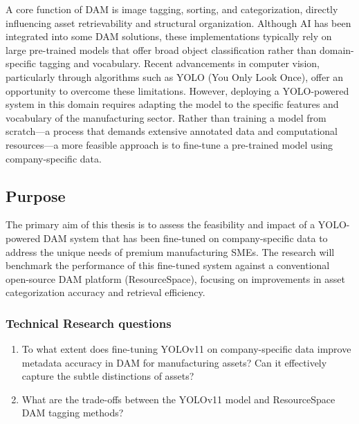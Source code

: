 \documentclass[a4paper,10pt,twocolumn]{article}
\numberwithin{figure}{section}
\numberwithin{table}{section}
\begin{document}
A core function of DAM is image tagging, sorting, and categorization, directly influencing asset 
retrievability and structural organization. Although AI has been integrated into some DAM solutions,
 these implementations typically rely on large pre-trained models that offer broad object classification 
 rather than domain-specific tagging and vocabulary. Recent advancements in computer vision, 
 particularly through algorithms such as YOLO (You Only Look Once), 
offer an opportunity to overcome these limitations. However, deploying a YOLO-powered system in this domain
 requires adapting the model to the specific features and vocabulary of the manufacturing sector. Rather than
  training a model from scratch—a process that demands extensive annotated data and computational resources—a 
  more feasible approach is to fine-tune a pre-trained model using company-specific data. 


\subsection{Purpose}
The primary aim of this thesis is to assess the feasibility and impact of a YOLO-powered DAM system 
that has been fine-tuned on company-specific data to address the unique needs of premium manufacturing SMEs. 
The research will benchmark the performance of this fine-tuned system against a conventional open-source DAM 
platform (ResourceSpace), focusing on improvements in asset categorization accuracy
and retrieval efficiency. 

\vspace{0.3cm}
\subsubsection{Technical Research questions}
\vspace{0.3cm}

\begin{enumerate}[label=(\alph*)]
    \item To what extent does fine-tuning YOLOv11 on company-specific data improve metadata accuracy in DAM for manufacturing assets?
    Can it effectively capture the subtle distinctions of assets? 
    
    \item What are the trade-offs between the YOLOv11 model and ResourceSpace DAM tagging methods?
\end{enumerate}
\end{document}
